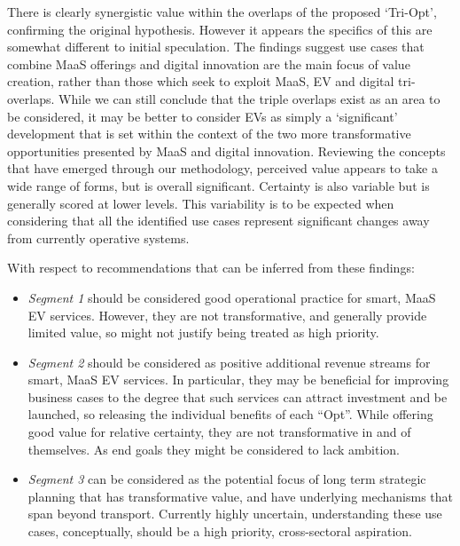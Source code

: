 \documentclass[b5paper,10pt]{article}
\begin{document}

There is clearly synergistic value within the overlaps of the proposed
`Tri-Opt', confirming the original hypothesis. However it appears the
specifics of this are somewhat different to initial speculation. The
findings suggest use cases that combine MaaS offerings and digital
innovation are the main focus of value creation, rather than those
which seek to exploit MaaS, EV and digital tri-overlaps. While we can
still conclude that the triple overlaps exist as an area to be
considered, it may be better to consider EVs as simply a `significant'
development that is set within the context of the two more
transformative opportunities presented by MaaS and digital
innovation. Reviewing the concepts that have emerged through our
methodology, perceived value appears to take a wide range of forms,
but is overall significant. Certainty is also variable but is
generally scored at lower levels. This variability is to be expected
when considering that all the identified use cases represent
significant changes away from currently operative systems.

With respect to recommendations that can be inferred from these findings:

\begin{itemize}
\item {\emph{Segment 1}} should be considered good operational
practice for smart, MaaS EV services. However, they are not
transformative, and generally provide limited value, so might not
justify being treated as high priority.
\item {\emph{Segment 2}} should be considered as positive additional
revenue streams for smart, MaaS EV services. In particular, they may
be beneficial for improving business cases to the degree that such
services can attract investment and be launched, so releasing the
individual benefits of each ``Opt''. While offering good value for
relative certainty, they are not transformative in and of themselves.
As end goals they might be considered to lack ambition.
\item {\emph{Segment 3}} can be considered as the potential focus of
long term strategic planning that has transformative value, and have
underlying mechanisms that span beyond transport. Currently highly
uncertain, understanding these use cases, conceptually, should be a
high priority, cross-sectoral aspiration.
\end{itemize}
\end{document}
